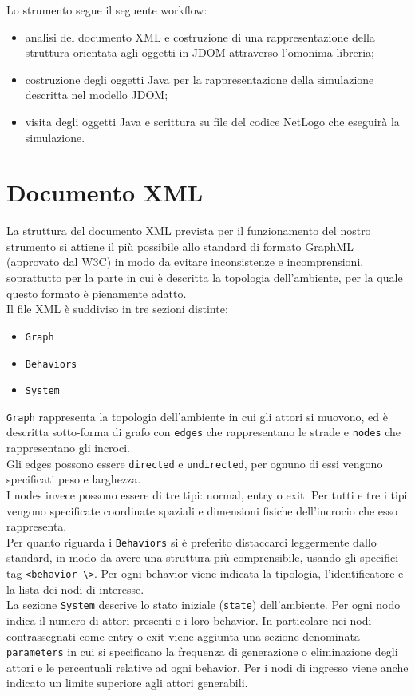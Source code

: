 Lo strumento segue il seguente workflow:
\begin{itemize}
\item analisi del documento XML e costruzione di una rappresentazione della struttura orientata agli oggetti in JDOM attraverso l'omonima libreria;
\item costruzione degli oggetti Java per la rappresentazione della simulazione descritta nel modello JDOM;
\item visita degli oggetti Java e scrittura su file del codice NetLogo che eseguirà la simulazione.
\end{itemize}

\section{Documento XML}
La struttura del documento XML prevista per il funzionamento del nostro strumento si attiene il più possibile allo standard di formato GraphML \cite{graphml} (approvato dal W3C) in modo da evitare inconsistenze e incomprensioni, soprattutto per la parte in cui è descritta la topologia dell'ambiente, per la quale questo formato è pienamente adatto.\\
Il file XML è suddiviso in tre sezioni distinte:
\begin{itemize}
\item \texttt{Graph}
\item \texttt{Behaviors}
\item \texttt{System}
\end{itemize} 
\texttt{Graph} rappresenta la topologia dell'ambiente in cui gli attori si muovono, ed è descritta sotto-forma di grafo con \texttt{edges} che rappresentano le strade e \texttt{nodes} che rappresentano gli incroci.\\
Gli edges possono essere \texttt{directed} e \texttt{undirected}, per ognuno di essi vengono specificati peso e larghezza.\\
I nodes invece possono essere di tre tipi: normal, entry o exit. Per tutti e tre i tipi vengono specificate coordinate spaziali e dimensioni fisiche dell'incrocio che esso rappresenta.\\
Per quanto riguarda i \texttt{Behaviors} si è preferito distaccarci leggermente dallo standard, in modo da avere una struttura più comprensibile, usando gli specifici tag \texttt{<behavior \textbackslash>}. Per ogni behavior viene indicata la tipologia, l'identificatore e la lista dei nodi di interesse.\\
La sezione \texttt{System} descrive lo stato iniziale (\texttt{state}) dell'ambiente. Per ogni nodo indica il numero di attori presenti e i loro behavior. In particolare nei nodi contrassegnati come entry o exit viene aggiunta una sezione denominata \texttt{parameters} in cui si specificano la frequenza di generazione o eliminazione degli attori e le percentuali relative ad ogni behavior. Per i nodi di ingresso viene anche indicato un limite superiore agli attori generabili.

